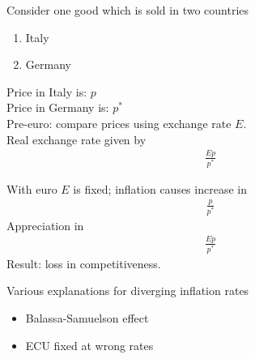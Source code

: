 \documentclass{beamer}
\begin{document}
\begin{frame}
  Consider one good which is sold in two countries
  \begin{enumerate}
    \item Italy
    \item Germany
  \end{enumerate}
  Price in Italy is: $p$\\
  Price in Germany is: $p^*$\\
  \medskip  
  Pre-euro: compare prices using exchange rate $E$.\\
  Real exchange rate given by
  \begin{align}
    \frac{Ep}{p^*}
  \end{align}  
\end{frame}

\begin{frame}  
  With  euro $E$ is fixed; inflation causes increase in 
  \begin{align}
    \frac{p}{p^*}
  \end{align}
  \medskip
  Appreciation in 
  \begin{align}
    \frac{Ep}{p^*}
  \end{align}
  \medskip
  Result: loss in competitiveness. 
\end{frame}

\begin{frame}
 Various explanations for diverging inflation rates
 \begin{itemize}
   \item Balassa-Samuelson effect
   \item ECU fixed at wrong rates
 \end{itemize}
\end{frame}
\end{document}
